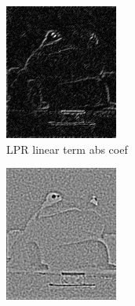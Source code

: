 \documentclass{beamer}
\begin{document}
\begin{frame}
\begin{figure}[htb]
\begin{subfigure}[b]{0.24\linewidth}
      \includegraphics[width=\linewidth]{images/edge_2.png}
      \caption{LPR linear term abs coef}
    \end{subfigure}
    \begin{subfigure}[b]{0.24\linewidth}
      \includegraphics[width=\linewidth]{images/edge_3.png}

\end{subfigure}
\end{figure}
\end{frame}
\end{document}

